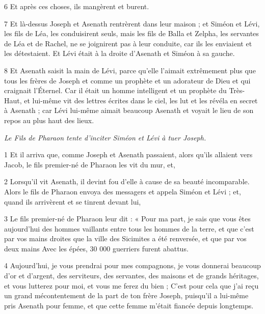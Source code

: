\par 6 Et après ces choses, ils mangèrent et burent.

\par 7 Et là-dessus Joseph et Asenath rentrèrent dans leur maison ; et Siméon et Lévi, les fils de Léa, les conduisirent seuls, mais les fils de Balla et Zelpha, les servantes de Léa et de Rachel, ne se joignirent pas à leur conduite, car ils les enviaient et les détestaient. Et Lévi était à la droite d'Asenath et Siméon à sa gauche.

\par 8 Et Asenath saisit la main de Lévi, parce qu'elle l'aimait extrêmement plus que tous les frères de Joseph et comme un prophète et un adorateur de Dieu et qui craignait l'Éternel. Car il était un homme intelligent et un prophète du Très-Haut, et lui-même vit des lettres écrites dans le ciel, les lut et les révéla en secret à Asenath ; car Lévi lui-même aimait beaucoup Asenath et voyait le lieu de son repos au plus haut des lieux.


\par \textit{Le Fils de Pharaon tente d'inciter Siméon et Lévi à tuer Joseph.}


\par 1 Et il arriva que, comme Joseph et Asenath passaient, alors qu'ils allaient vers Jacob, le fils premier-né de Pharaon les vit du mur, et,

\par 2 Lorsqu'il vit Asenath, il devint fou d'elle à cause de sa beauté incomparable. Alors le fils de Pharaon envoya des messagers et appela Siméon et Lévi ; et, quand ils arrivèrent et se tinrent devant lui,

\par 3 Le fils premier-né de Pharaon leur dit : « Pour ma part, je sais que vous êtes aujourd'hui des hommes vaillants entre tous les hommes de la terre, et que c'est par vos mains droites que la ville des Sicimites a été renversée, et que par vos deux mains Avec les épées, 30 000 guerriers furent abattus.

\par 4 Aujourd'hui, je vous prendrai pour mes compagnons, je vous donnerai beaucoup d'or et d'argent, des serviteurs, des servantes, des maisons et de grands héritages, et vous lutterez pour moi, et vous me ferez du bien ; C'est pour cela que j'ai reçu un grand mécontentement de la part de ton frère Joseph, puisqu'il a lui-même pris Asenath pour femme, et que cette femme m'était fiancée depuis longtemps.

